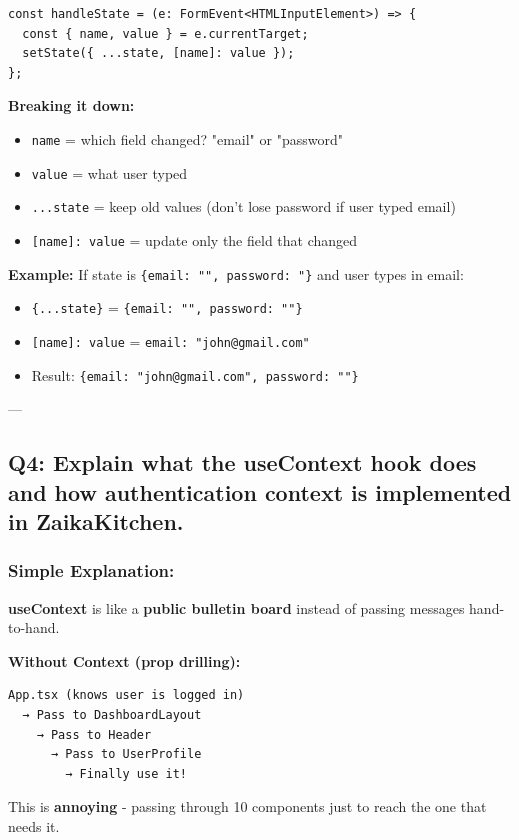 \documentclass[12pt]{article}
\begin{document}
\begin{lstlisting}
const handleState = (e: FormEvent<HTMLInputElement>) => {
  const { name, value } = e.currentTarget;
  setState({ ...state, [name]: value });
};
\end{lstlisting}

\textbf{Breaking it down:}
\begin{itemize}
    \item \texttt{name} = which field changed? "email" or "password"
    \item \texttt{value} = what user typed
    \item \texttt{...state} = keep old values (don't lose password if user typed email)
    \item \texttt{[name]: value} = update only the field that changed
\end{itemize}

\textbf{Example:} If state is \texttt{\{email: "", password: "\}} and user types in email:
\begin{itemize}
    \item \texttt{\{...state\}} = \texttt{\{email: "", password: ""\}}
    \item \texttt{[name]: value} = \texttt{email: "john@gmail.com"}
    \item Result: \texttt{\{email: "john@gmail.com", password: ""\}}
\end{itemize}

---

\subsection{Q4: Explain what the useContext hook does and how authentication context is implemented in ZaikaKitchen.}

\subsubsection*{Simple Explanation:}

\textbf{useContext} is like a \textbf{public bulletin board} instead of passing messages hand-to-hand.

\textbf{Without Context (prop drilling):}
\begin{lstlisting}
App.tsx (knows user is logged in)
  → Pass to DashboardLayout
    → Pass to Header
      → Pass to UserProfile
        → Finally use it!
\end{lstlisting}

This is \textbf{annoying} - passing through 10 components just to reach the one that needs it.
\end{document}
